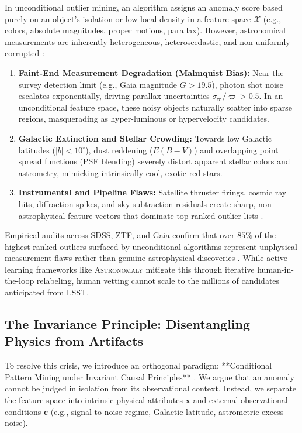 \documentclass[10pt,a4paper]{article}
\begin{document}
In unconditional outlier mining, an algorithm assigns an anomaly score based purely on an object's isolation or low local density in a feature space $\mathcal{X}$ (e.g., colors, absolute magnitudes, proper motions, parallax). However, astronomical measurements are inherently heterogeneous, heteroscedastic, and non-uniformly corrupted \citep{baron2019critical, kennamer2020robust}:
\begin{enumerate}
    \item \textbf{Faint-End Measurement Degradation (Malmquist Bias):} Near the survey detection limit (e.g., Gaia magnitude $G > 19.5$), photon shot noise escalates exponentially, driving parallax uncertainties $\sigma_\varpi / \varpi > 0.5$. In an unconditional feature space, these noisy objects naturally scatter into sparse regions, masquerading as hyper-luminous or hypervelocity candidates.
    \item \textbf{Galactic Extinction and Stellar Crowding:} Towards low Galactic latitudes ($|b| < 10^\circ$), dust reddening ($E(B-V)$) and overlapping point spread functions (PSF blending) severely distort apparent stellar colors and astrometry, mimicking intrinsically cool, exotic red stars.
    \item \textbf{Instrumental and Pipeline Flaws:} Satellite thruster firings, cosmic ray hits, diffraction spikes, and sky-subtraction residuals create sharp, non-astrophysical feature vectors that dominate top-ranked outlier lists \citep{giles2019kepler, narayan2018ztf, aleo2023yse}.
\end{enumerate}

Empirical audits across SDSS, ZTF, and Gaia confirm that over $85\%$ of the highest-ranked outliers surfaced by unconditional algorithms represent unphysical measurement flaws rather than genuine astrophysical discoveries \citep{baron2019critical, lochner2021astronomaly}. While active learning frameworks like \textsc{Astronomaly} \citep{lochner2021astronomaly, ishida2021active} mitigate this through iterative human-in-the-loop relabeling, human vetting cannot scale to the millions of candidates anticipated from LSST.

\subsection{The Invariance Principle: Disentangling Physics from Artifacts}
To resolve this crisis, we introduce an orthogonal paradigm: **Conditional Pattern Mining under Invariant Causal Principles** \citep{peters2016invariant, fournierviger2017contrast}. We argue that an anomaly cannot be judged in isolation from its observational context. Instead, we separate the feature space into intrinsic physical attributes $\mathbf{x}$ and external observational conditions $\mathbf{c}$ (e.g., signal-to-noise regime, Galactic latitude, astrometric excess noise).
\end{document}
